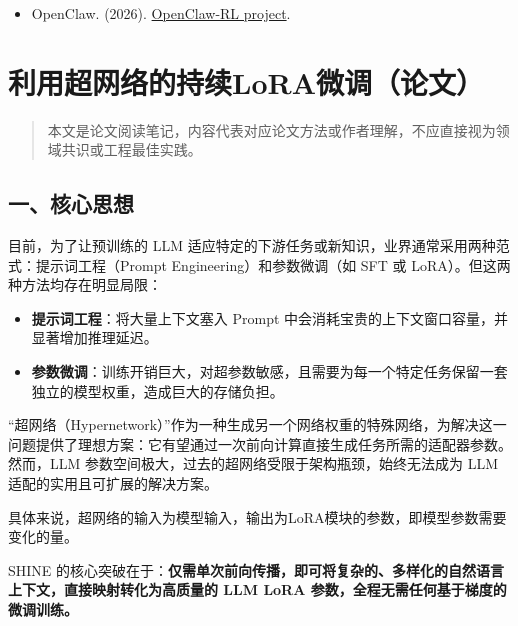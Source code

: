 \begin{itemize}
\tightlist
\item
  OpenClaw. (2026). \href{https://github.com/openclaw/openclaw}{OpenClaw-RL project}.
\end{itemize}

\clearpage

\hypertarget{ux5229ux7528ux8d85ux7f51ux7edcux7684ux6301ux7eedloraux5faeux8c03ux8bbaux6587}{%
\section{利用超网络的持续LoRA微调（论文）}\label{ux5229ux7528ux8d85ux7f51ux7edcux7684ux6301ux7eedloraux5faeux8c03ux8bbaux6587}}

\begin{quote}
本文是论文阅读笔记，内容代表对应论文方法或作者理解，不应直接视为领域共识或工程最佳实践。
\end{quote}

\hypertarget{ux4e00ux6838ux5fc3ux601dux60f3-16}{%
\subsection{一、核心思想}\label{ux4e00ux6838ux5fc3ux601dux60f3-16}}

目前，为了让预训练的 LLM 适应特定的下游任务或新知识，业界通常采用两种范式：提示词工程（Prompt Engineering）和参数微调（如 SFT 或 LoRA）。但这两种方法均存在明显局限：

\begin{itemize}
\tightlist
\item
  \textbf{提示词工程}：将大量上下文塞入 Prompt 中会消耗宝贵的上下文窗口容量，并显著增加推理延迟。
\item
  \textbf{参数微调}：训练开销巨大，对超参数敏感，且需要为每一个特定任务保留一套独立的模型权重，造成巨大的存储负担。
\end{itemize}

``超网络（Hypernetwork）''作为一种生成另一个网络权重的特殊网络，为解决这一问题提供了理想方案：它有望通过一次前向计算直接生成任务所需的适配器参数。然而，LLM 参数空间极大，过去的超网络受限于架构瓶颈，始终无法成为 LLM 适配的实用且可扩展的解决方案。

具体来说，超网络的输入为模型输入，输出为LoRA模块的参数，即模型参数需要变化的量。

SHINE 的核心突破在于：\textbf{仅需单次前向传播，即可将复杂的、多样化的自然语言上下文，直接映射转化为高质量的 LLM LoRA 参数，全程无需任何基于梯度的微调训练。}

